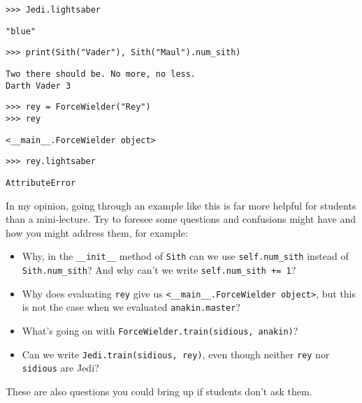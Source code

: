 \begin{lstlisting}
>>> Jedi.lightsaber 
\end{lstlisting}
\begin{solution}[.2in]
\begin{lstlisting}
"blue"
\end{lstlisting}
\end{solution}

\begin{lstlisting}
>>> print(Sith("Vader"), Sith("Maul").num_sith)
\end{lstlisting}
\begin{solution}[.2in]
\begin{lstlisting}
Two there should be. No more, no less.
Darth Vader 3
\end{lstlisting}
\end{solution}

\begin{lstlisting}
>>> rey = ForceWielder("Rey")
>>> rey
\end{lstlisting}
\begin{solution}[.2in]
\begin{lstlisting}
<__main__.ForceWielder object>
\end{lstlisting}
\end{solution}

\begin{lstlisting}
>>> rey.lightsaber
\end{lstlisting}
\begin{solution}[.2in]
\begin{lstlisting}
AttributeError
\end{lstlisting}
\end{solution}

\begin{questionmeta}
In my opinion, going through an example like this is far more helpful for students than a mini-lecture. Try to foresee some questions and confusions might have and how you might address them, for example:
\begin{itemize}
    \item Why, in the \lstinline{__init__} method of \lstinline{Sith} can we use \lstinline{self.num_sith} instead of \lstinline{Sith.num_sith}? And why can't we write \lstinline{self.num_sith += 1}?
    \item Why does evaluating \lstinline{rey} give us \lstinline{<__main__.ForceWielder object>}, but this is not the case when we evaluated \lstinline{anakin.master}? 
    \item What's going on with \lstinline{ForceWielder.train(sidious, anakin)}? 
    \item Can we write \lstinline{Jedi.train(sidious, rey)}, even though neither \lstinline{rey} nor \lstinline{sidious} are Jedi? 
\end{itemize}
These are also questions you could bring up if students don't ask them. 
\end{questionmeta}